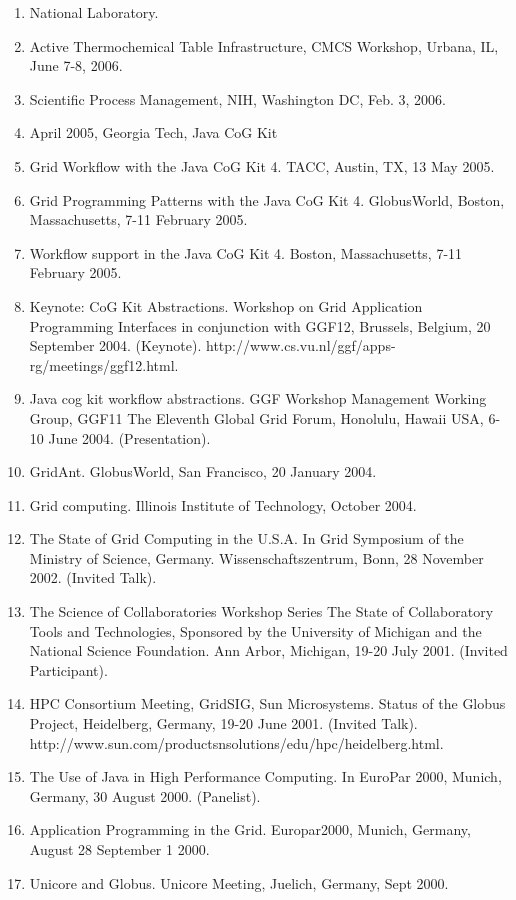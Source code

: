 \documentclass{article}
\begin{document}
\begin{enumerate}
\item  National Laboratory. 
\item  Active Thermochemical Table Infrastructure, CMCS Workshop, Urbana, IL, June 7-8, 2006. 
\item  Scientific Process Management, NIH, Washington DC, Feb. 3, 2006. 
\item  April 2005, Georgia Tech, Java CoG Kit 
\item  Grid Workflow with the Java CoG Kit 4. TACC, Austin, TX, 13 May 2005. 
\item  Grid Programming Patterns with the Java CoG Kit 4. GlobusWorld, Boston, Massachusetts, 7-11 February 2005. 
\item  Workflow support in the Java CoG Kit 4. Boston, Massachusetts, 7-11 February 2005. 
\item  Keynote: CoG Kit Abstractions. Workshop on Grid Application Programming Interfaces in conjunction with GGF12, Brussels, Belgium, 20 September 2004. (Keynote). http://www.cs.vu.nl/ggf/apps-rg/meetings/ggf12.html. 
\item  Java cog kit workflow abstractions. GGF Workshop Management Working Group, GGF11 The Eleventh Global Grid Forum, Honolulu, Hawaii USA, 6-10 June 2004. (Presentation). 
\item  GridAnt. GlobusWorld, San Francisco, 20 January 2004. 
\item  Grid computing. Illinois Institute of Technology, October 2004. 
\item  The State of Grid Computing in the U.S.A. In Grid Symposium of the Ministry of Science, Germany. Wissenschaftszentrum, Bonn, 28 November 2002. (Invited Talk). 
\item  The Science of Collaboratories Workshop Series The State of Collaboratory Tools and Technologies, Sponsored by the University of Michigan and the National Science Foundation. Ann Arbor, Michigan, 19-20 July 2001. (Invited Participant). 
\item  HPC Consortium Meeting, GridSIG, Sun Microsystems. Status of the Globus Project, Heidelberg, Germany, 19-20 June 2001. (Invited Talk). http://www.sun.com/productsnsolutions/edu/hpc/heidelberg.html. 
\item  The Use of Java in High Performance Computing. In EuroPar 2000, Munich, Germany, 30 August 2000. (Panelist). 
\item  Application Programming in the Grid. Europar2000, Munich, Germany, August 28 September 1 2000. 
\item  Unicore and Globus. Unicore Meeting, Juelich, Germany, Sept 2000. 

\end{enumerate}
\end{document}
